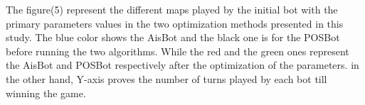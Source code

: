 \documentclass[]{interact}
\theoremstyle{plain}%
\theoremstyle{definition}
\theoremstyle{remark}
\begin{document}
The figure(5) represent the different maps played by the initial bot with the primary parameters values in the two optimization methods presented in this study. The blue color shows the AisBot and the black one is for the POSBot before running the two algorithms. While the red and the green ones represent the AisBot and POSBot respectively after the optimization of the parameters. in the other hand, Y-axis proves the number of turns played by each bot till winning the game. \\

\end{document}
